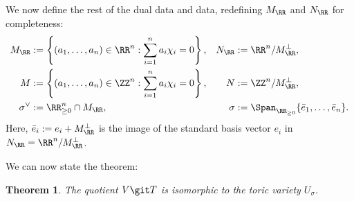 \documentclass[12pt]{amsart}
\theoremstyle{plain}
\newtheorem{theorem}{Theorem}[subsection]
\begin{document}
We now define the rest of the dual data and data, redefining $M_\RR$ and $N_\RR$ for completeness:
\begin{align*}
	M_\RR &:= \left\{(a_1, \ldots, a_n) \in \RR^n : \sum_{i=1}^n a_i \chi_i = 0 \right\}, & N_\RR &:= \RR^n / M_\RR^\perp, \\
	M &:= \left\{(a_1, \ldots, a_n) \in \ZZ^n : \sum_{i=1}^n a_i \chi_i = 0 \right\}, & N &:= \ZZ^n / M_\RR^\perp, \\
	\sigma^\vee &:= \RR_{\ge 0}^n \cap M_\RR, & \sigma &:= \Span_{\RR_{\ge 0}}\{\bar e_1, \ldots, \bar e_n\}.
\end{align*}
Here, $\bar e_i := e_i + M_\RR^\perp$ is the image of the standard basis vector $e_i$ in $N_\RR = \RR^n / M_\RR^\perp$.

We can now state the theorem:

\begin{theorem}\label{theorem:torusquotientsastoricvarieties}
The quotient $V \git T$ is isomorphic to the toric variety $U_\sigma$.
\end{theorem}
\end{document}
